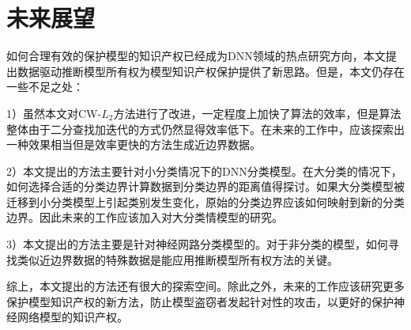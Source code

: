 \section{未来展望}

如何合理有效的保护模型的知识产权已经成为DNN领域的热点研究方向，本文提出数据驱动推断模型所有权为模型知识产权保护提供了新思路。但是，本文仍存在一些不足之处：

1）虽然本文对CW-$L_2$方法进行了改进，一定程度上加快了算法的效率，但是算法整体由于二分查找加迭代的方式仍然显得效率低下。在未来的工作中，应该探索出一种效果相当但是效率更快的方法生成近边界数据。

2）本文提出的方法主要针对小分类情况下的DNN分类模型。在大分类的情况下，如何选择合适的分类边界计算数据到分类边界的距离值得探讨。如果大分类模型被迁移到小分类模型上引起类别发生变化，原始的分类边界应该如何映射到新的分类边界。因此未来的工作应该加入对大分类情模型的研究。

3）本文提出的方法主要是针对神经网路分类模型的。对于非分类的模型，如何寻找类似近边界数据的特殊数据是能应用推断模型所有权方法的关键。


综上，本文提出的方法还有很大的探索空间。除此之外，未来的工作应该研究更多保护模型知识产权的新方法，防止模型盗窃者发起针对性的攻击，以更好的保护神经网络模型的知识产权。





